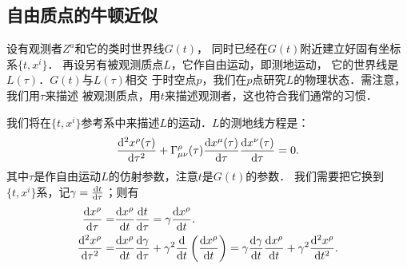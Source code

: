 \subsection{自由质点的牛顿近似}
设有观测者$Z^a$和它的类时世界线$G(t)$，
同时已经在$G(t)$附近建立好固有坐标系$\{t,x^i\}$．
再设另有被观测质点$L$，它作自由运动，即测地运动，
它的世界线是$L(\tau)$．$G(t)$与$L(\tau)$相交
于时空点$p$，我们在$p$点研究$L$的物理状态．需注意，我们用$\tau$来描述
被观测质点，用$t$来描述观测者，这也符合我们通常的习惯．

我们将在$\{t,x^i\}$参考系中来描述$L$的运动．$L$的测地线方程是：
\begin{equation}\label{chfd:eqn_gdL}
    \frac{{\rm d}^2 x^\rho(\tau)}{{\rm d}\tau^2} + \Gamma_{\mu\nu}^\rho(\tau)
    \frac{{\rm d}x^\mu(\tau)}{{\rm d} \tau} \frac{{\rm d}x^\nu(\tau)}{{\rm d} \tau} =0.
\end{equation}
其中$\tau$是作自由运动$L$的仿射参数，注意$t$是$G(t)$的参数．
我们需要把它换到$\{t,x^i\}$系，记$\gamma=\frac{{\rm d} t}{{\rm d} \tau}$；则有
\begin{align}
    \frac{{\rm d} x^\rho}{{\rm d} \tau} =& \frac{{\rm d} x^\rho}{{\rm d} t}\frac{{\rm d} t}{{\rm d} \tau}
      =  \gamma \frac{{\rm d} x^\rho}{{\rm d} t} . \\
    \frac{{\rm d}^2 x^\rho}{{\rm d} \tau^2}=&  
      \frac{{\rm d} x^\rho}{{\rm d} t} \frac{{\rm d} \gamma}{{\rm d} \tau}
      +\gamma^2 \frac{{\rm d} }{{\rm d} t} \left( \frac{{\rm d} x^\rho}{{\rm d} t}\right)
      = \gamma \frac{{\rm d} \gamma}{{\rm d} t} \frac{{\rm d} x^\rho}{{\rm d} t}
       +\gamma^2 \frac{{\rm d}^2 x^\rho}{{\rm d} t^2} .
\end{align}


